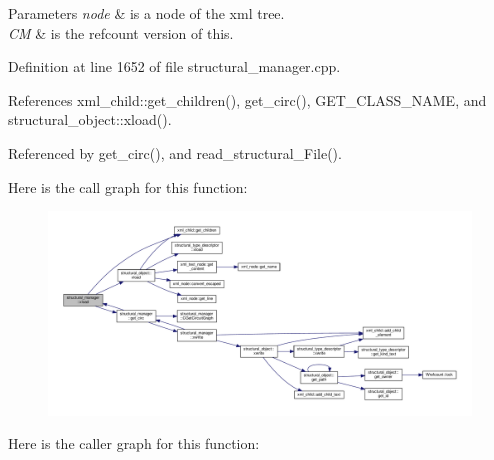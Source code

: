 \begin{DoxyParams}{Parameters}
{\em node} & is a node of the xml tree. \\
\hline
{\em CM} & is the refcount version of this. \\
\hline
\end{DoxyParams}


Definition at line 1652 of file structural\+\_\+manager.\+cpp.



References xml\+\_\+child\+::get\+\_\+children(), get\+\_\+circ(), G\+E\+T\+\_\+\+C\+L\+A\+S\+S\+\_\+\+N\+A\+ME, and structural\+\_\+object\+::xload().



Referenced by get\+\_\+circ(), and read\+\_\+structural\+\_\+\+File().

Here is the call graph for this function\+:
\nopagebreak
\begin{figure}[H]
\begin{center}
\leavevmode
\includegraphics[width=350pt]{d7/d6b/classstructural__manager_a13ea548d745b21b07a8cca52a67bb7cf_cgraph}
\end{center}
\end{figure}
Here is the caller graph for this function\+:
\nopagebreak

